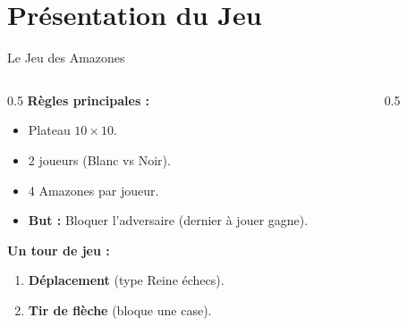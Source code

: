 \documentclass{beamer}
\begin{document}
\section{Présentation du Jeu}
\begin{frame}{Le Jeu des Amazones}
    \begin{columns}
        \begin{column}{0.5\textwidth}
            \textbf{Règles principales :}
            \begin{itemize}
                \item Plateau $10 \times 10$.
                \item 2 joueurs (Blanc vs Noir).
                \item 4 Amazones par joueur.
                \item \textbf{But :} Bloquer l'adversaire (dernier à jouer gagne).
            \end{itemize}
            
            \vspace{0.5cm}
            \textbf{Un tour de jeu :}
            \begin{enumerate}
                \item \textbf{Déplacement} (type Reine échecs).
                \item \textbf{Tir de flèche} (bloque une case).
            \end{enumerate}
        \end{column}
        \begin{column}{0.5\textwidth}
            \centering
        \end{column}
    \end{columns}
\end{frame}

\end{document}
